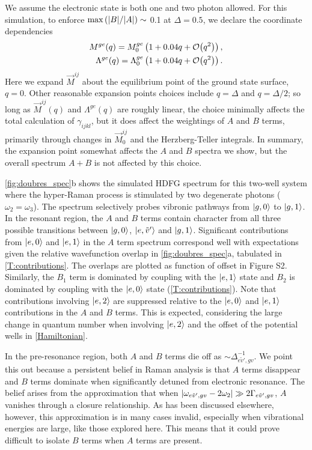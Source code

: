 \documentclass[aip, jcp, reprint, onecolumn, nofootinbib]{revtex4-2}
\begin{document}
We assume the electronic state is both one and two photon allowed.
For this simulation, to enforce $\max \left(\abs{B}/\abs{A}\right) \sim$ 0.1 at $\Delta = 0.5$, we declare the coordinate dependencies
\begin{eqnarray}
	M^{ge}(q) = M^{ge}_0 \left(1 + 0.04 q + \order{q^2}\right),  \\
	\Lambda^{ge}(q) = \Lambda^{ge}_0 \left(1 + 0.04 q + \order{q^2}\right).
\end{eqnarray}
Here we expand $\vec{M}^{ij}$ about the equilibrium point of the ground state surface, $q = 0$.
Other reasonable expansion points choices include $q=\Delta$ and $q=\Delta/2$;\cite{Kundu2022}
so long as $\vec{M}^{ij}(q)$ and $\Lambda^{ge}(q)$ are roughly linear, the choice minimally affects the total calculation of $\gamma_{ijkl}$, but it does affect the weightings of $A$ and $B$ terms, primarily through changes in $\vec{M}_0^{ij}$ and the Herzberg-Teller integrals.
In summary, the expansion point somewhat affects the $A$ and $B$ spectra we show, but the overall spectrum $A+B$ is not affected by this choice.

\autoref{fig:doubres_spec}b shows the simulated HDFG spectrum for this two-well system where the hyper-Raman process is stimulated by two degenerate photons ($\omega_2 = \omega_3$). 
The spectrum selectively probes vibronic pathways from $\ket{g,0}$ to $\ket{g,1}$.
In the resonant region, the $A$ and $B$ terms contain character from all three possible transitions between $\ket{g,0}$, $\ket{e,\tilde{v}'}$ and $\ket{g,1}$. 
Significant contributions from $\ket{e,0}$ and $\ket{e,1}$ in the $A$ term spectrum correspond well with expectations given the relative wavefunction overlap in \autoref{fig:doubres_spec}a, tabulated in \autoref{T:contributions}. 
The overlaps are plotted as function of offset in Figure S2.
Similarly, the $B_1$ term is dominated by coupling with the $\ket{e,1}$ state and $B_2$ is dominated by coupling with the $\ket{e,0}$ state (\autoref{T:contributions}). 
Note that contributions involving $\ket{e,2}$ are suppressed relative to the $\ket{e,0}$ and $\ket{e,1}$ contributions in the $A$ and $B$ terms.
This is expected, considering the large change in quantum number when involving $\ket{e,2}$ and the offset of the potential wells in \autoref{Hamiltonian}.

In the pre-resonance region, both $A$ and $B$ terms die off as $\sim \Delta_{e\tilde{v}',gv}^{-1}$.
We point this out because a persistent belief in Raman analysis is that $A$ terms disappear and $B$ terms dominate when significantly detuned from electronic resonance.
The belief arises from the approximation that when $\abs{\omega_{e\tilde{v}',gv} - 2\omega_2} \gg 2\Gamma_{e\tilde{v}',gv}$, $A$ vanishes through a closure relationship.\cite{Neddersen1989}
As has been discussed elsewhere, however, this approximation is in many cases invalid, especially when vibrational energies are large, like those explored here.\cite{Warshel1977, Myers1982, Li1990, Gong2015}
This means that it could prove difficult to isolate $B$ terms when $A$ terms are present.
\end{document}
